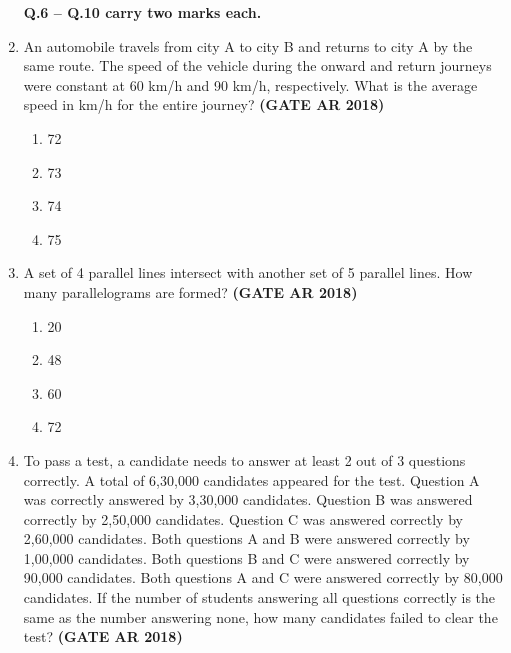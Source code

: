 \documentclass[journal,15pt,onecolumn]{IEEEtran}
\theoremstyle{remark}
\begin{document}
\begin{enumerate}
\vspace*{1cm} %

 \hspace{0.2cm} \textbf{Q.6 -- Q.10 carry two marks each.}


\item 
An automobile travels from city A to city B and returns to city A by the same route. The speed of the vehicle during the onward and return journeys were constant at 60 km/h and 90 km/h, respectively. What is the average speed in km/h for the entire journey? \hfill \textbf{ (GATE AR 2018)}



\begin{enumerate}

\item    72 
\item    73 
\item    74 
\item    75 

\end{enumerate}


\item  A set of 4 parallel lines intersect with another set of 5 parallel lines. How many parallelograms are formed?\hfill \textbf{ (GATE AR 2018)}

\vspace{0.5cm}

\begin{enumerate}
\item   20 
\item   48 
\item   60 
\item   72
\end{enumerate}


\item 
 To pass a test, a candidate needs to answer at least 2 out of 3 questions correctly. A total of 6,30,000 candidates appeared for the test. Question A was correctly answered by 3,30,000 candidates. Question B was answered correctly by 2,50,000 candidates. Question C was answered correctly by 2,60,000 candidates. Both questions A and B were answered correctly by 1,00,000 candidates. Both questions B and C were answered correctly by 90,000 candidates. Both questions A and C were answered correctly by 80,000 candidates. If the number of students answering all questions correctly is the same as the number answering none, how many candidates failed to clear the test?\hfill \textbf{ (GATE AR 2018)}
      


\end{enumerate}
\end{document}
